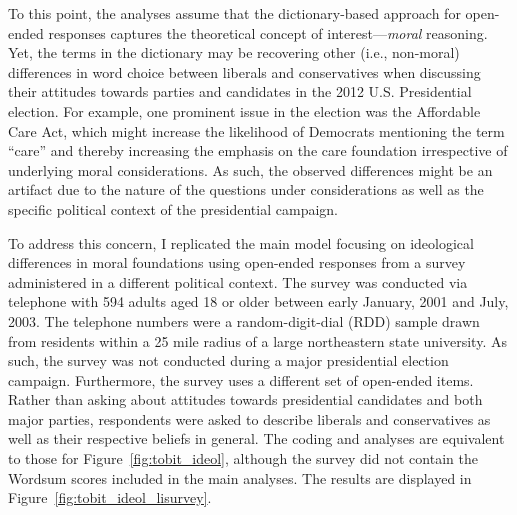 \documentclass[12pt]{article}
\begin{document}
To this point, the analyses assume that the dictionary-based approach for open-ended responses captures the theoretical concept of interest---\textit{moral} reasoning. Yet, the terms in the dictionary may be recovering other (i.e., non-moral) differences in word choice between liberals and conservatives when discussing their attitudes towards parties and candidates in the 2012 U.S. Presidential election. For example, one prominent issue in the election was the Affordable Care Act, which might increase the likelihood of Democrats mentioning the term ``care'' and thereby increasing the emphasis on the care foundation irrespective of underlying moral considerations. As such, the observed differences might be an artifact due to the nature of the questions under considerations as well as the specific political context of the presidential campaign.

To address this concern, I replicated the main model focusing on ideological differences in moral foundations using open-ended responses from a survey administered in a different political context. The survey was conducted via telephone with 594 adults aged 18 or older between early January, 2001 and July, 2003. The telephone numbers were a random-digit-dial (RDD) sample drawn from residents within a 25 mile radius of a large northeastern state university. As such, the survey was not conducted during a  major presidential election campaign. Furthermore, the survey uses a different set of open-ended items. Rather than asking about attitudes towards presidential candidates and both major parties, respondents were asked to describe liberals and conservatives as well as their respective beliefs in general. The coding and analyses are equivalent to those for Figure~\ref{fig:tobit_ideol}, although the survey did not contain the Wordsum scores included in the main analyses. The results are displayed in Figure~\ref{fig:tobit_ideol_lisurvey}.
\end{document}
